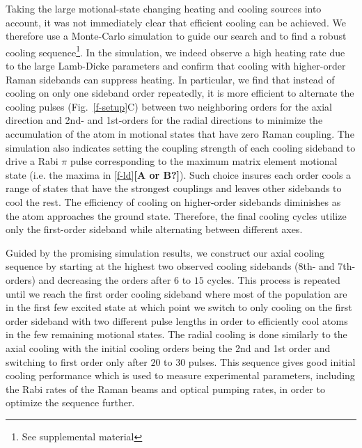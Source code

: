 \documentclass[aps,prl,twocolumn,groupedaddress]{revtex4-1}
\newcommand{\fxnote}[1]{{\textbf{[#1]}}}
\begin{document}
Taking the large motional-state changing heating and cooling sources into account,
it was not immediately clear that efficient cooling can be achieved.
We therefore use a Monte-Carlo simulation to guide our search and
to find a robust cooling sequence\footnote{See supplemental material}.
In the simulation, we indeed observe a high heating rate due to the large Lamb-Dicke parameters
and confirm that cooling with higher-order Raman sidebands can suppress heating.
In particular, we find that instead of cooling on only one sideband order repeatedly,
it is more efficient to alternate the cooling pulses (Fig.~\ref{f-setup}C) between two
neighboring orders for the axial direction and 2nd- and 1st-orders for the radial directions
to minimize the accumulation of the atom in motional states that have zero Raman coupling.
The simulation also indicates setting the coupling strength of each cooling sideband
to drive a Rabi $\pi$ pulse corresponding to the maximum matrix element motional state
(i.e. the maxima in \ref{f-ld}\fxnote{A or B?}).
Such choice insures each order cools a range of states that have the strongest
couplings and leaves other sidebands to cool the rest.
The efficiency of cooling on higher-order sidebands diminishes
as the atom approaches the ground state.
Therefore, the final cooling cycles utilize only the first-order sideband
while alternating between different axes.

Guided by the promising simulation results,
we construct our axial cooling sequence by starting at the highest
two observed cooling sidebands (8th- and 7th-orders)
and decreasing the orders after $6$ to $15$ cycles.
This process is repeated until we reach the first order cooling sideband where most of the
population are in the first few excited state at which point we switch to only cooling on the
first order sideband with two different pulse lengths in order to efficiently cool atoms in the
few remaining motional states.
The radial cooling is done similarly to the axial cooling with the initial cooling orders being
the 2nd and 1st order and switching to first order only after $20$ to $30$ pulses.
This sequence gives good initial cooling performance which is used to measure experimental
parameters, including the Rabi rates of the Raman beams and optical pumping rates,
in order to optimize the sequence further.
\end{document}
